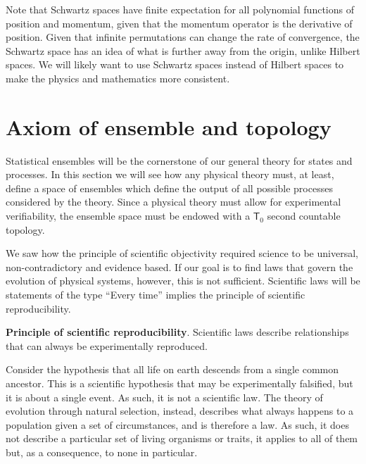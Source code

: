 Note that Schwartz spaces have finite expectation for all polynomial functions of position and momentum, given that the momentum operator is the derivative of position. Given that infinite permutations can change the rate of convergence, the Schwartz space has an idea of what is further away from the origin, unlike Hilbert spaces. We will likely want to use Schwartz spaces instead of Hilbert spaces to make the physics and mathematics more consistent.

\section{Axiom of ensemble and topology}

Statistical ensembles will be the cornerstone of our general theory for states and processes. In this section we will see how any physical theory must, at least, define a space of ensembles which define the output of all possible processes considered by the theory. Since a physical theory must allow for experimental verifiability, the ensemble space must be endowed with a $\mathsf{T}_0$ second countable topology.

We saw how the principle of scientific objectivity required science to be universal, non-contradictory and evidence based. If our goal is to find laws that govern the evolution of physical systems, however, this is not sufficient. Scientific laws will be statements of the type  ``Every time'' implies the principle of scientific reproducibility.
\begin{mathSection}
	\textbf{Principle of scientific reproducibility}.
	Scientific laws describe relationships that can always be experimentally reproduced.
\end{mathSection}

Consider the hypothesis that all life on earth descends from a single common ancestor. This is a scientific hypothesis that may be experimentally falsified, but it is about a single event. As such, it is not a scientific law. The theory of evolution through natural selection, instead, describes what always happens to a population given a set of circumstances, and is therefore a law. As such, it does not describe a particular set of living organisms or traits, it applies to all of them but, as a consequence, to none in particular.

